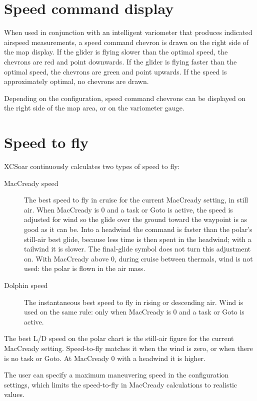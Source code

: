 \section{Speed command display}

When used in conjunction with an intelligent variometer that produces
indicated airspeed measurements, a speed command chevron is drawn
on the right side of the map display.  If the glider is flying slower
than the optimal speed, the chevrons are red and point downwards.  If
the glider is flying faster than the optimal speed, the chevrons are
green and point upwards.  If the speed is approximately optimal, no
chevrons are drawn.


Depending on the configuration, speed command chevrons can be
displayed on the right side of the map area, or on the variometer
gauge.


\section{Speed to fly}\label{sec:stf}

XCSoar continuously calculates two types of speed to fly:
\begin{description}
\item[MacCready speed]  The best speed to fly in cruise for the
  current MacCready setting, in still air.  When MacCready is 0 and a
  task or Goto is active, the speed is adjusted for wind so the glide
  over the ground toward the waypoint is as good as it can be.  Into
  a headwind the command is faster than the polar's still-air best
  glide, because less time is then spent in the headwind; with a
  tailwind it is slower.  The final-glide symbol does not turn this
  adjustment on.  With MacCready above 0, during cruise between
  thermals, wind is not used: the polar is flown in the air mass.
\item[Dolphin speed]  The instantaneous best speed to fly in rising
  or descending air.  Wind is used on the same rule: only when
  MacCready is 0 and a task or Goto is active.
\end{description}

The best L/D speed on the polar chart is the still-air figure for the
current MacCready setting.  Speed-to-fly matches it when the wind is
zero, or when there is no task or Goto.  At MacCready 0 with a
headwind it is higher.  

The user can specify a maximum maneuvering speed in the configuration
settings, which limits the speed-to-fly in MacCready calculations to
realistic values.


